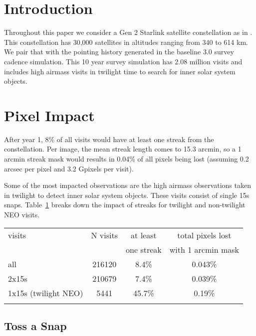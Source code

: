 \section{Introduction}

Throughout this paper we consider a Gen 2 Starlink satellite constellation as in \citet{Hu2022}. This constellation has 30,000 satellites in altitudes ranging from 340 to 614 km. We pair that with the pointing history generated in the baseline 3.0 survey cadence simulation. This 10 year survey simulation has 2.08 million visits and includes high airmass visits in twilight time to search for inner solar system objects.




\section{Pixel Impact}

After year 1, 8\% of all visits would have at least one streak from the constellation. Per image, the mean streak length comes to 15.3 arcmin, so a 1 arcmin streak mask would results in 0.04\% of all pixels being lost (assuming 0.2 arcsec per pixel and 3.2 Gpixels per visit).

Some of the most impacted observations are the high airmass observations taken in twilight to detect inner solar system objects. These visits consist of single 15s snaps. Table~\ref{table:pixel} breaks down the impact of streaks for twilight and non-twilight NEO visits. 

\begin{table}
\begin{tabular}{ l  c  c c}
  visits & N visits & at least  & total pixels lost \\
  & & one streak & with 1 arcmin mask \\
  \hline			
  all & 216120 & 8.4\%  & 0.043\% \\
  2x15s & 210679 & 7.4\% &  0.039\% \\
  1x15s (twilight NEO)  & 5441 & 45.7\% & 0.19\% \\
  \hline  
  \label{table:pixel}
\end{tabular}
\end{table}


\subsection{Toss a Snap}

